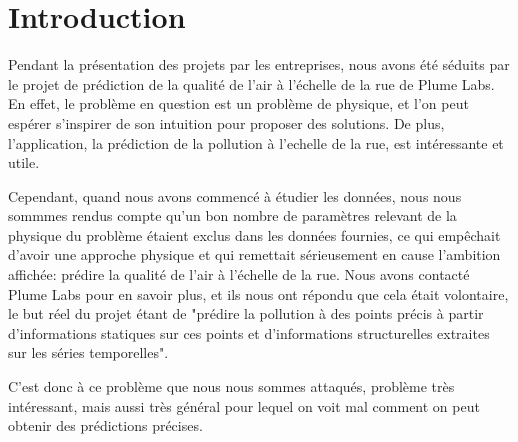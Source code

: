 \section*{Introduction}

Pendant la présentation des projets par les entreprises, nous avons été séduits par le projet de prédiction de la qualité de l'air à l'échelle de la rue de Plume Labs.
En effet, le problème en question est un problème de physique, et l'on peut espérer s'inspirer de son intuition pour proposer des solutions.
De plus, l'application, la prédiction de la pollution à l'echelle de la rue, est intéressante et utile.

Cependant, quand nous avons commencé à étudier les données, nous nous sommmes rendus compte qu'un bon nombre de paramètres relevant de la physique du problème étaient exclus dans les données fournies, ce qui empêchait d'avoir une approche physique et qui remettait sérieusement en cause l'ambition affichée: prédire la qualité de l'air à l'échelle de la rue.
Nous avons contacté Plume Labs pour en savoir plus, et ils nous ont répondu que cela était volontaire, le but réel du projet étant de "prédire la pollution à des points précis à partir d'informations statiques sur ces points et d'informations structurelles extraites sur les séries temporelles".

C'est donc à ce problème que nous nous sommes attaqués, problème très intéressant, mais aussi très général pour lequel on voit mal comment on peut obtenir des prédictions précises.

